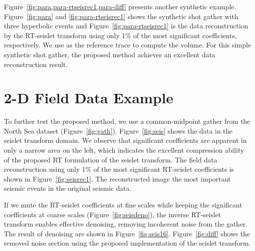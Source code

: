     Figure~\ref{fig:para,para-rtseisrec1,para-diff} presents another synthetic example. 
    Figure~\ref{fig:para} and \ref{fig:para-rtseisrec1} shows the synthetic shot gather with three hyperbolic 
    events and Figure~\ref{fig:para-rtseisrec1} is the data reconstruction by the 
    RT-seislet transform using only 1\% of the most significant coefficients, respectively. 
    We use  as the reference trace to compute the 
     volume.
    For this simple synthetic shot gather, the proposed method achieves an 
    excellent data reconstruction result.

    
\section{2-D Field Data Example}
    To further test the proposed method, we use a common-midpoint gather from the 
    North Sea dataset (Figure~\ref{fig:gath}). Figure~\ref{fig:seis} shows the 
    data in the seislet transform domain. We observe that significant 
    coefficients are apparent in only a narrow area on the left, which 
    indicates the excellent compression ability of the proposed RT formulation 
    of the seislet transform. The field data reconstruction using only 1\% of 
    the most significant RT-seislet coefficients is shown in 
    Figure~\ref{fig:seisrec1}. The reconstructed image  the most 
    important seismic events in the original seismic data.

    If we mute the RT-seislet coefficients at fine scales while keeping the 
    significant coefficients at coarse scales (Figure~\ref{fig:seisdeno}), the 
    inverse RT-seislet transform enables effective denoising, removing 
    incoherent noise from the gather. 
    The result of denoising are shown in Figure~\ref{fig:seis16}. 
    Figure~\ref{fig:diff} shows the removed noise section using the proposed implementation of the seislet transform.

